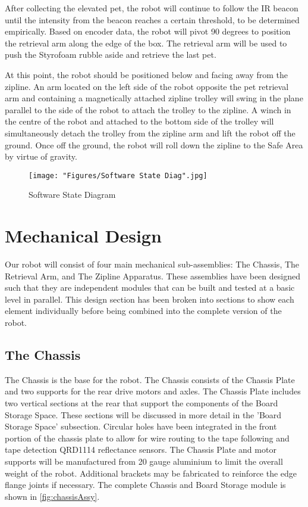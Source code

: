 \documentclass[11pt, oneside]{article} %
\begin{document}
After collecting the elevated pet, the robot will continue to follow the IR beacon until the intensity from the beacon reaches a certain threshold, to be determined empirically. Based on encoder data, the robot will pivot 90 degrees to position the retrieval arm along the edge of the box. The retrieval arm will be used to push the Styrofoam rubble aside and retrieve the last pet.

At this point, the robot should be positioned below and facing away from the zipline. An arm located on the left side of the robot opposite the pet retrieval arm and containing a magnetically attached zipline trolley will swing in the plane parallel to the side of the robot to attach the trolley to the zipline. A winch in the centre of the robot and attached to the bottom side of the trolley will simultaneously detach the trolley from the zipline arm and lift the robot off the ground. Once off the ground, the robot will roll down the zipline to the Safe Area by virtue of gravity.

\begin{figure}[h]
	\centering
	\texttt{[image: "Figures/Software State Diag".jpg]}
	\caption[Software State Diagram]{Software State Diagram}
	\label{fig:SoftStates}
\end{figure}

\section{Mechanical Design}

Our robot will consist of four main mechanical sub-assemblies: The Chassis, The Retrieval Arm, and The Zipline Apparatus. These assemblies have been designed such that they are independent modules that can be built and tested at a basic level in parallel. This design section has been broken into sections to show each element individually before being combined into the complete version of the robot.

	\subsection{The Chassis}

	The Chassis is the base for the robot. The Chassis consists of the Chassis Plate and two supports for the rear drive motors and axles. The Chassis Plate includes two vertical sections at the rear that support the components of the Board Storage Space. These sections will be discussed in more detail in the 'Board Storage Space' subsection. Circular holes have been integrated in the front portion of the chassis plate to allow for wire routing to the tape following and tape detection QRD1114 reflectance sensors. The Chassis Plate and motor supports will be manufactured from 20 gauge aluminium to limit the overall weight of the robot. Additional brackets may be fabricated to reinforce the edge flange joints if necessary. The complete Chassis and Board Storage module is shown in \autoref{fig:chassisAssy}.
\end{document}
